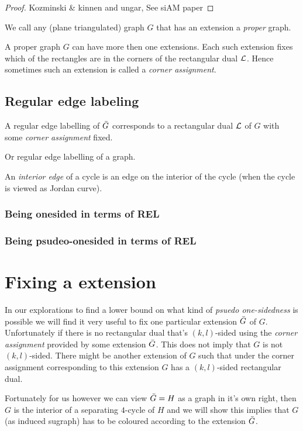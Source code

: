 \documentclass[a4paper]{article}
\theoremstyle{definition}
\begin{document}
\begin{proof}
Kozminski \& kinnen and ungar, See siAM paper %
\end{proof}

We call any (plane triangulated) graph $G$ that has an extension a \emph{proper} graph.

A proper graph $G$ can have more then one extensions. Each such extension fixes which of the rectangles are in the corners of the rectangular dual $\mathcal{L}$. Hence sometimes such an extension is called a \emph{corner assignment}.


\subsection{Regular edge labeling}
A regular edge labelling  of $\bar{G}$ corresponds to a rectangular dual $\mathcal{L}$ of $G$ with some \emph{corner assignment} fixed. %

Or regular edge labelling of a graph.


An \emph{interior edge} of a cycle is an edge on the interior of the cycle (when the cycle is viewed as Jordan curve).


\subsubsection{Being onesided in terms of REL}

\subsubsection{Being psudeo-onesided in terms of REL}

\section{Fixing a extension}
In our explorations to find a lower bound on what kind of \emph{psuedo one-sidedness} is possible we will find it very useful to fix one particular extension $\bar{G}$ of $G$. Unfortunately if there is no rectangular dual that’s $(k,l)$-sided using the \emph{corner assignment} provided by some extension $\bar{G}$. This does not imply that $G$ is not $(k,l)$-sided. There might be another extension of $G$ such that under the corner assignment corresponding to this extension $G$ has a $(k,l)$-sided rectangular dual. 

Fortunately for us however we can view $\bar{G} = H$ as a graph in it's own right, then $G$ is the interior of a separating $4$-cycle of $H$ and we will show this implies that $G$ (as induced sugraph) has to be coloured according to the extension $\bar{G}$. 
\end{document}
